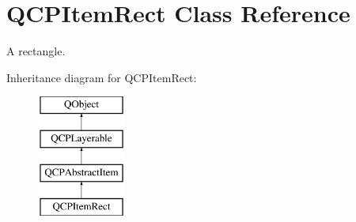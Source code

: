 \hypertarget{classQCPItemRect}{\section{Q\-C\-P\-Item\-Rect Class Reference}
\label{classQCPItemRect}
}


A rectangle.  


Inheritance diagram for Q\-C\-P\-Item\-Rect\-:\begin{figure}[H]
\begin{center}
\leavevmode
\includegraphics[height=4.000000cm]{classQCPItemRect}
\end{center}
\end{figure}
